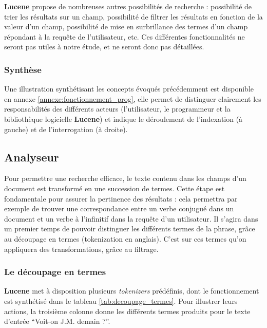 \textbf{Lucene} propose de nombreuses autres possibilités de recherche : possibilité de trier les résultats sur un champ, possibilité de filtrer les résultats en fonction de la valeur d’un champ, possibilité de mise en surbrillance des termes d’un champ répondant à la requête de l’utilisateur, etc. Ces différentes fonctionnalités ne seront pas utiles à notre étude, et ne seront donc pas détaillées.

\subsubsection{Synthèse}

Une illustration synthétisant les concepts évoqués précédemment est disponible en annexe \ref{annexe:fonctionnement_prog}, elle permet de distinguer clairement les responsabilités des différents acteurs (l’utilisateur, le programmeur et la bibliothèque logicielle \textbf{Lucene}) et indique le déroulement de l’indexation (à gauche) et de l'interrogation (à droite).


\subsection{Analyseur}

Pour permettre une recherche efficace, le texte contenu dans les champs d’un document est transformé en une succession de termes. Cette étape est fondamentale pour assurer la pertinence des résultats : cela permettra par exemple de trouver une correspondance entre un verbe conjugué dans un document et un verbe à l’infinitif dans la requête d’un utilisateur. Il s’agira dans un premier temps de pouvoir distinguer les différents termes de la phrase, grâce au découpage en termes (tokenization en anglais). C’est sur ces termes qu’on appliquera des transformations, grâce au filtrage.

\subsubsection{Le découpage en termes}
\label{section:tokenizer}

\textbf{Lucene} met à disposition plusieurs \textit{tokenizers} prédéfinis, dont le fonctionnement est synthétisé dans le tableau \ref{tab:decoupage_termes}. Pour illustrer leurs actions, la troisième colonne donne les différents termes produits pour le texte d’entrée “Voit-on J.M. demain ?”.
 
